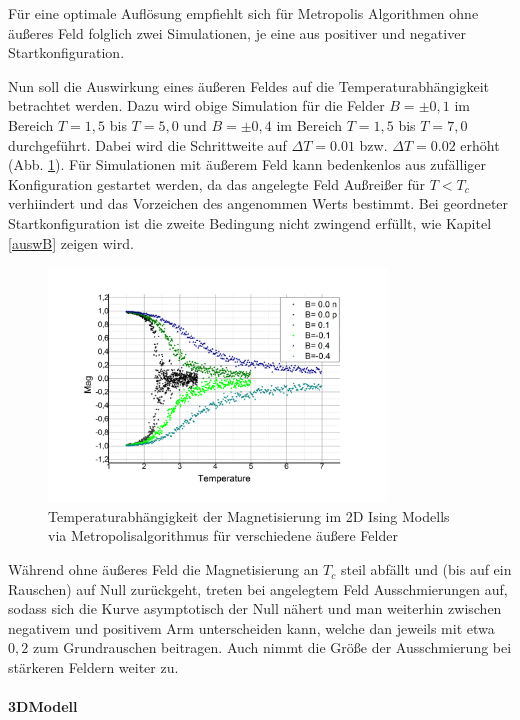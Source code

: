 Für eine optimale Auflösung empfiehlt sich für Metropolis Algorithmen ohne äußeres Feld folglich zwei Simulationen, je eine aus positiver und negativer Startkonfiguration.


Nun soll die Auswirkung eines äußeren Feldes auf die Temperaturabhängigkeit betrachtet werden. Dazu wird obige Simulation für die Felder $B=\pm 0,1$ im Bereich $T=1,5$ bis $T=5,0$ und $B=\pm 0,4$ im Bereich $T=1,5$ bis $T=7,0$ durchgeführt. Dabei wird die Schrittweite auf $\Delta T = 0.01$ bzw. $\Delta T = 0.02$ erhöht (Abb. \ref{mp2db}). Für Simulationen mit äußerem Feld kann bedenkenlos aus zufälliger Konfiguration gestartet werden, da das angelegte Feld Außreißer für $T<T_{c}$ verhiindert und das Vorzeichen des angenommen Werts bestimmt. Bei geordneter Startkonfiguration ist die zweite Bedingung nicht zwingend erfüllt, wie Kapitel \ref{auswB} zeigen wird.
\begin{figure}[H]
	\centering
	\includegraphics[width=0.8\textwidth]{../Graph_Export/MP2D/m(T)_MP2D_50_Plot.jpg}	
	\caption{Temperaturabhängigkeit der Magnetisierung im 2D Ising Modells via Metropolisalgorithmus für verschiedene äußere Felder}
	\label{mp2db}
\end{figure}
Während ohne äußeres Feld die Magnetisierung an $T_{c}$ steil abfällt und (bis auf ein Rauschen) auf Null zurückgeht, treten bei angelegtem Feld Ausschmierungen auf, sodass sich die Kurve asymptotisch der Null nähert und man weiterhin zwischen negativem und positivem Arm unterscheiden kann, welche dan jeweils mit etwa $0,2$ zum Grundrauschen beitragen. Auch nimmt die Größe der Ausschmierung bei stärkeren Feldern weiter zu.


\paragraph{3DModell}

